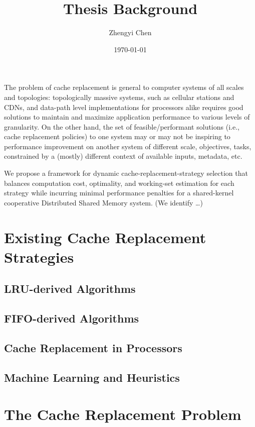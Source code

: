 \documentclass{article}
\title{Thesis Background}
\author{Zhengyi Chen}
\date{\today}
\begin{document}
\maketitle


The problem of cache replacement is general to computer systems of all scales and topologies: 
topologically massive systems, such as cellular stations\cite{GWHSZ.2014.CacheReplAsMDP-QLearning} 
and CDNs\cites{EHOFK.2020.IBM-LRUvsFIFO}{!BGW.2010.CDN}{KD.2002.Akamai_CoordCacheRepl}, and  
data-path level implementations for processors\cites{QJPSE.2007.DIP}{JTSE.2010.RRIP}{SYS.2021.RLR} 
alike requires good solutions to maintain and maximize application performance 
to various levels of granularity. On the other hand, the set of feasible/performant solutions 
(i.e., cache replacement policies) to one system may or may not be inspiring to performance 
improvement on another system of different scale, objectives, tasks, constrained by a 
(mostly) different context of available inputs, metadata, etc. 

We propose a framework for dynamic cache-replacement-strategy selection that balances computation 
cost, optimality, and working-set estimation for each strategy while incurring minimal performance 
penalties for a shared-kernel cooperative Distributed Shared Memory system. (We identify \dots)

\section[1]{Existing Cache Replacement Strategies}
\subsection[1.1]{LRU-derived Algorithms}
\subsection[1.2]{FIFO-derived Algorithms}
\subsection[1.3]{Cache Replacement in Processors}
\subsection[1.4]{Machine Learning and Heuristics}

\section[2]{The Cache Replacement Problem}
\end{document}
